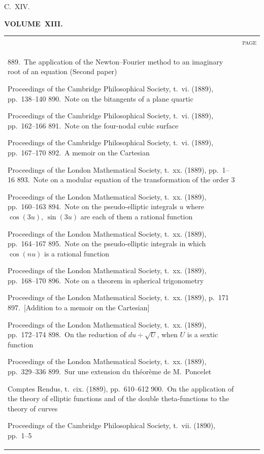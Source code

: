 \documentclass[11pt,a4paper]{book}
\providecommand{\paperentry}[3]{#1.\ #2\dotfill #3\par}
\begin{document}
\newpage
\thispagestyle{empty}
\fancyhead[C]{}
\noindent\hfill{\large C.~XIV.}\hfill\null\vspace{0.5em}

\begin{center}
{\Large\bfseries VOLUME~XIII.}
\end{center}
\vspace{0.5em}

\begin{center}
\begin{tabular}{p{4.2in}r}
& \textsc{page} \\
\paperentry{889}{The application of the Newton--Fourier method to an imaginary root of an equation (Second paper)}{1}{Proceedings of the Cambridge Philosophical Society, t.~vi. (1889), pp.~138--140}
\paperentry{890}{Note on the bitangents of a plane quartic}{4}{Proceedings of the Cambridge Philosophical Society, t.~vi. (1889), pp.~162--166}
\paperentry{891}{Note on the four-nodal cubic surface}{8}{Proceedings of the Cambridge Philosophical Society, t.~vi. (1889), pp.~167--170}
\paperentry{892}{A memoir on the Cartesian}{11}{Proceedings of the London Mathematical Society, t.~xx. (1889), pp.~1--16}
\paperentry{893}{Note on a modular equation of the transformation of the order 3}{27}{Proceedings of the London Mathematical Society, t.~xx. (1889), pp.~160--163}
\paperentry{894}{Note on the pseudo-elliptic integrals $u$ where $\cos(3u)$, $\sin(3u)$ are each of them a rational function}{30}{Proceedings of the London Mathematical Society, t.~xx. (1889), pp.~164--167}
\paperentry{895}{Note on the pseudo-elliptic integrals in which $\cos(nu)$ is a rational function}{33}{Proceedings of the London Mathematical Society, t.~xx. (1889), pp.~168--170}
\paperentry{896}{Note on a theorem in spherical trigonometry}{36}{Proceedings of the London Mathematical Society, t.~xx. (1889), p.~171}
\paperentry{897}{[Addition to a memoir on the Cartesian]}{37}{Proceedings of the London Mathematical Society, t.~xx. (1889), pp.~172--174}
\paperentry{898}{On the reduction of $du \div \sqrt{U}$, when $U$ is a sextic function}{40}{Proceedings of the London Mathematical Society, t.~xx. (1889), pp.~329--336}
\paperentry{899}{Sur une extension du th\'{e}or\`{e}me de M.~Poncelet}{47}{Comptes Rendus, t.~cix. (1889), pp.~610--612}
\paperentry{900}{On the application of the theory of elliptic functions and of the double theta-functions to the theory of curves}{49}{Proceedings of the Cambridge Philosophical Society, t.~vii. (1890), pp.~1--5}

\end{tabular}
\end{center}
\end{document}

